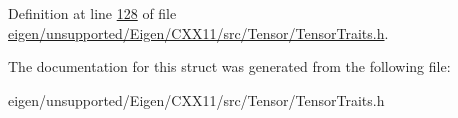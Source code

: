 Definition at line \hyperlink{eigen_2unsupported_2_eigen_2_c_x_x11_2src_2_tensor_2_tensor_traits_8h_source_l00128}{128} of file \hyperlink{eigen_2unsupported_2_eigen_2_c_x_x11_2src_2_tensor_2_tensor_traits_8h_source}{eigen/unsupported/\+Eigen/\+C\+X\+X11/src/\+Tensor/\+Tensor\+Traits.\+h}.



The documentation for this struct was generated from the following file\+:\begin{DoxyCompactItemize}
\item 
eigen/unsupported/\+Eigen/\+C\+X\+X11/src/\+Tensor/\+Tensor\+Traits.\+h\end{DoxyCompactItemize}
